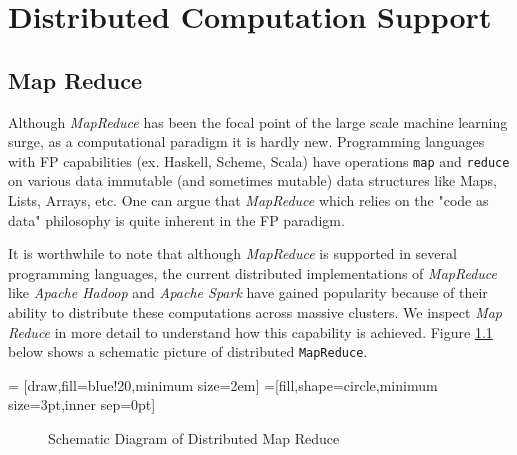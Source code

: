 \chapter{Distributed Computation Support}
\label{cha:3}

\section{Map Reduce}

Although \textit{MapReduce} \cite{MapReduce} has been the focal point of the large scale machine learning surge, as a computational paradigm it is hardly new. Programming languages with FP capabilities (ex. Haskell, Scheme, Scala) have operations \texttt{map} and \texttt{reduce} on various data immutable (and sometimes mutable) data structures like Maps, Lists, Arrays, etc. One can argue that \textit{MapReduce} which relies on the "code as data" philosophy is quite inherent in the FP paradigm.

It is worthwhile to note that although \textit{MapReduce} is supported in several programming languages, the current distributed implementations of \textit{MapReduce} like \textit{Apache Hadoop} \cite{Hadoop:2005} and \textit{Apache Spark} have gained popularity because of their ability to distribute these computations across massive clusters. We inspect \textit{Map Reduce} in more detail to understand how this capability is achieved. Figure \ref{fig:mapreduce} below shows a schematic picture of distributed \texttt{MapReduce}.

 = [draw,fill=blue!20,minimum size=2em]
\def\radius{.7mm} 
=[fill,shape=circle,minimum size=3pt,inner sep=0pt]
\begin{figure}[!ht] 
\begin{adjustbox}{max width=\textwidth}
\end{adjustbox}
\caption{Schematic Diagram of Distributed Map Reduce}
\label{fig:mapreduce}
\end{figure}

